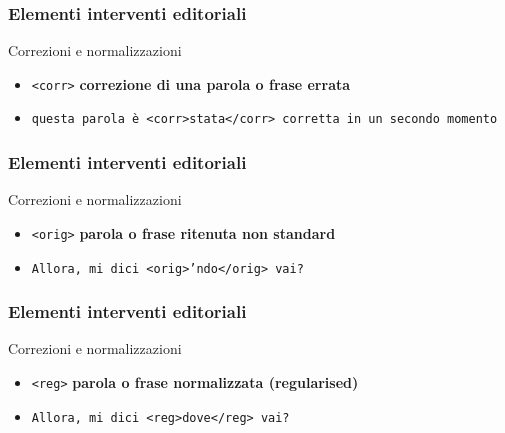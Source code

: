 \begin{frame}
    \frametitle{Elementi interventi editoriali}
    \addtocounter{nframe}{1}
    

    \begin{block}{Correzioni e normalizzazioni}
        \begin{itemize}
            \item \texttt{<corr>} \textbf{correzione di una parola o frase errata}
            \item[] \texttt{questa parola è <corr>stata</corr> corretta in un secondo momento}
        \end{itemize}
        
    \end{block}
    
\end{frame}

\begin{frame}
    \frametitle{Elementi interventi editoriali}
    \addtocounter{nframe}{1}
    

    \begin{block}{Correzioni e normalizzazioni}
        \begin{itemize}
            \item \texttt{<orig>} \textbf{parola o frase ritenuta non standard}
            \item[] \texttt{Allora, mi dici <orig>'ndo</orig> vai?}
        \end{itemize}
        
    \end{block}
    
\end{frame}

\begin{frame}
    \frametitle{Elementi interventi editoriali}
    \addtocounter{nframe}{1}
    

    \begin{block}{Correzioni e normalizzazioni}
        \begin{itemize}
            \item \texttt{<reg>} \textbf{parola o frase normalizzata (regularised)}
            \item[] \texttt{Allora, mi dici <reg>dove</reg> vai?}
        \end{itemize}
        
    \end{block}
    
\end{frame}

